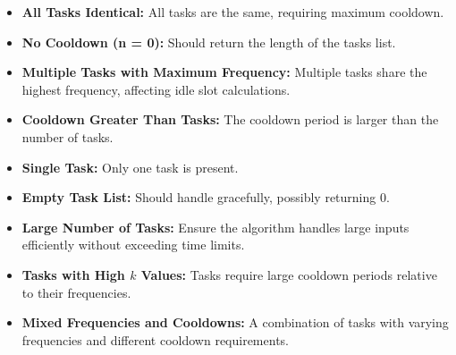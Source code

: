 \begin{itemize}
    \item \textbf{All Tasks Identical:} All tasks are the same, requiring maximum cooldown.
    
    \item \textbf{No Cooldown (n = 0):} Should return the length of the tasks list.
    
    \item \textbf{Multiple Tasks with Maximum Frequency:} Multiple tasks share the highest frequency, affecting idle slot calculations.
    
    \item \textbf{Cooldown Greater Than Tasks:} The cooldown period is larger than the number of tasks.
    
    \item \textbf{Single Task:} Only one task is present.
    
    \item \textbf{Empty Task List:} Should handle gracefully, possibly returning 0.
    
    \item \textbf{Large Number of Tasks:} Ensure the algorithm handles large inputs efficiently without exceeding time limits.
    
    \item \textbf{Tasks with High \( k \) Values:} Tasks require large cooldown periods relative to their frequencies.
    
    \item \textbf{Mixed Frequencies and Cooldowns:} A combination of tasks with varying frequencies and different cooldown requirements.
\end{itemize}

\printindex